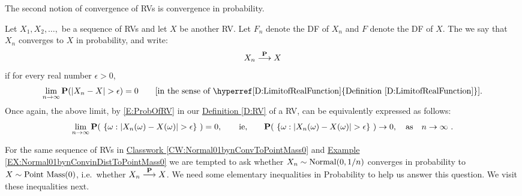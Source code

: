 The second notion of convergence of RVs is convergence in probability.

\begin{definition}\label{D:ConvInProb}
Let $X_1,X_2,\ldots,$ be a sequence of RVs and let $X$ be another RV.  Let $F_n$ denote the DF of $X_n$ and $F$ denote the DF of $X$.  The we say that $X_n$ converges to $X$ in probability, and write:
\[
X_n \overset{\mathbf{P}}{\longrightarrow} X
\]
if for every real number $\epsilon > 0$,
\[
\lim_{n \rightarrow \infty} \p(|X_n-X|> \epsilon) = 0 \qquad \text{[in the sense of \hyperref[D:LimitofRealFunction]{Definition \ref*{D:LimitofRealFunction}}].}
\]
Once again, the above limit, by \eqref{E:ProbOfRV} in our \hyperref[D:RV]{Definition \ref*{D:RV}} of a RV, can be equivalently expressed as follows: 
\[
\lim_{n \rightarrow \infty} \mathbf{P}( \ \{\omega: |X_n(\omega) - X(\omega)| > \epsilon\} \ )=0, \qquad \text{ie,} \qquad \mathbf{P}( \ \{\omega: |X_n(\omega) - X(\omega)| > \epsilon\} \ ) \rightarrow 0, \quad \text{as} \quad n \rightarrow \infty \ .
\]
\end{definition}
 
For the same sequence of RVs in  \hyperref[CW:Normal01bynConvToPointMass0]{Classwork \ref*{CW:Normal01bynConvToPointMass0}} and \hyperref[EX:Normal01bynConvinDistToPointMass0]{Example \ref*{EX:Normal01bynConvinDistToPointMass0}} we are tempted to ask whether $X_n \sim \mbox{{\rm Normal}}(0,1/n)$ converges in probability to $X \sim \mbox{{\rm Point~Mass}}(0)$, i.e.~whether $X_n \overset{\mathbf{P}}{\longrightarrow} X$.  We need some elementary inequalities in Probability to help us answer this question.  We visit these inequalities next.


